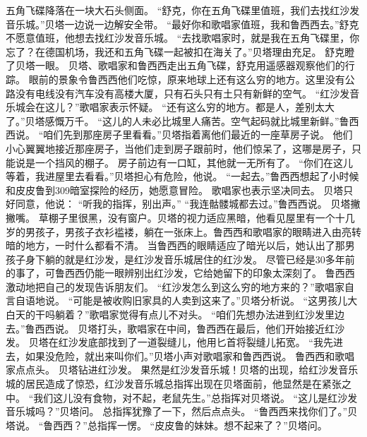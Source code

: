 \documentclass[a4paper,12pt,UTF8,twoside]{ctexbook}
\begin{document}
        五角飞碟降落在一块大石头侧面。  
        “舒克，你在五角飞碟里值班，我们去找红沙发音乐城。”贝塔一边说一边解安全带。  
        “最好你和歌唱家值班，我和鲁西西去。”舒克不愿意值班，他想去找红沙发音乐城。  
        “去找歌唱家时，就是我在五角飞碟里，你忘了？在德国机场，我还和五角飞碟一起被扣在海关了。”贝塔理由充足。  
        舒克瞪了贝塔一眼。  
        贝塔、歌唱家和鲁西西走出五角飞碟，舒克用遥感器观察他们的行踪。  
        眼前的景象令鲁西西他们吃惊，原来地球上还有这么穷的地方。这里没有公路没有电线没有汽车没有高楼大厦，只有石头只有土只有新鲜的空气。  
        “红沙发音乐城会在这儿？”歌唱家表示怀疑。  
        “还有这么穷的地方。都是人，差别太大了。”贝塔感慨万千。  
        “这儿的人未必比城里人痛苦。空气起码就比城里新鲜。”鲁西西说。  
        “咱们先到那座房子里看看。”贝塔指着离他们最近的一座草房子说。  
        他们小心翼翼地接近那座房子，当他们走到房子跟前时，他们惊呆了，这哪是房子，只能说是一个挡风的棚子。  
        房子前边有一口缸，其他就一无所有了。  
        “你们在这儿等着，我进屋里去看看。”贝塔担心有危险，他说。  
        “一起去。”鲁西西想起了小时候和皮皮鲁到309暗室探险的经历，她愿意冒险。  
        歌唱家也表示坚决同去。  
        贝塔只好同意，他说：  
        “听我的指挥，别出声。”  
        “我连骷髅城都去过。”鲁西西说。  
        贝塔撇撇嘴。  
        草棚子里很黑，没有窗户。贝塔的视力适应黑暗，他看见屋里有一个十几岁的男孩子，男孩子衣衫褴褛，躺在一张床上。鲁西西和歌唱家的眼睛进入由亮转暗的地方，一时什么都看不清。  
        当鲁西西的眼睛适应了暗光以后，她认出了那男孩子身下躺的就是红沙发，是红沙发音乐城居住的红沙发。  
        尽管已经是30多年前的事了，可鲁西西仍能一眼辨别出红沙发，它给她留下的印象太深刻了。  
        鲁西西激动地把自己的发现告诉朋友们。  
        “红沙发怎么到这么穷的地方来的？”歌唱家自言自语地说。  
        “可能是被收购旧家具的人卖到这来了。”贝塔分析说。  
        “这男孩儿大白天的干吗躺着？”歌唱家觉得有点儿不对头。  
        “咱们先想办法进到红沙发里边去。”鲁西西说。  
        贝塔打头，歌唱家在中间，鲁西西在最后，他们开始接近红沙发。  
        贝塔在红沙发底部找到了一道裂缝儿，他用匕首将裂缝儿拓宽。  
        “我先进去，如果没危险，就出来叫你们。”贝塔小声对歌唱家和鲁西西说。  
        鲁西西和歌唱家点点头。  
        贝塔钻进红沙发。  
        果然是红沙发音乐城！贝塔的出现，给红沙发音乐城的居民造成了惊恐，红沙发音乐城总指挥出现在贝塔面前，他显然是在紧张之中。  
        “我们这儿没有食物，对不起，老鼠先生。”总指挥对贝塔说。  
        “这儿是红沙发音乐城吗？”贝塔问。  
        总指挥犹豫了一下，然后点点头。  
        “鲁西西来找你们了。”贝塔说。  
        “鲁西西？”总指挥一愣。  
        “皮皮鲁的妹妹。想不起来了？”贝塔问。  
\end{document}
